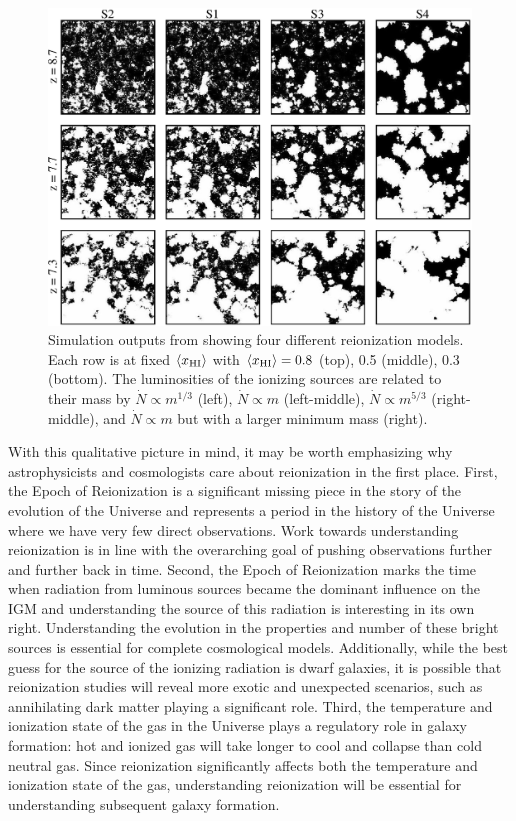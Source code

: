 \begin{figure}[h]
  \centering
  \includegraphics[width=14cm]{McQuinnHIITopology.eps}
  \caption{Simulation outputs from \cite{McQuinn2007} showing four different reionization models. Each row is at fixed $\langle x_{\text{HI}}\rangle$ with $\langle x_{\text{HI}}\rangle = 0.8$ (top), 0.5 (middle), 0.3 (bottom). The luminosities of the ionizing sources are related to their mass by $\dot{N} \propto m^{1/3}$ (left), $\dot{N} \propto m$ (left-middle), $\dot{N}\propto m^{5/3}$ (right-middle), and $\dot{N} \propto m$ but with a larger minimum mass (right). }
  \label{fig:McQuinnMorph}
\end{figure}


With this qualitative picture in mind, it may be worth emphasizing why astrophysicists and cosmologists care about reionization in the first place. First, the Epoch of Reionization is a significant missing piece in the story of the evolution of the Universe and represents a period in the history of the Universe where we have very few direct observations. Work towards understanding reionization is in line with the overarching goal of pushing observations further and further back in time. Second, the Epoch of Reionization marks the time when radiation from luminous sources became the dominant influence on the IGM and understanding the source of this radiation is interesting in its own right. Understanding the evolution in the properties and number of these bright sources is essential for complete cosmological models. Additionally, while the best guess for the source of the ionizing radiation is dwarf galaxies, it is possible that reionization studies will reveal more exotic and unexpected scenarios, such as annihilating dark matter playing a significant role. Third, the temperature and ionization state of the gas in the Universe plays a regulatory role in galaxy formation: hot and ionized gas will take longer to cool and collapse than cold neutral gas. Since reionization significantly affects both the temperature and ionization state of the gas, understanding reionization will be essential for understanding subsequent galaxy formation. 


